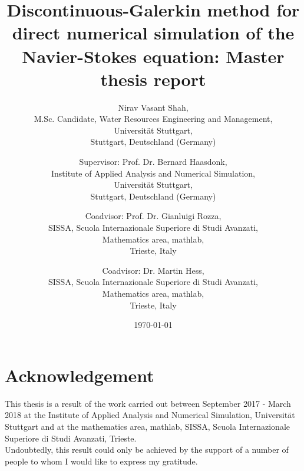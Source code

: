 \documentclass[a4paper,twoside,openright]{book}
\begin{document}
\begin{titlepage}

\title{Discontinuous-Galerkin method for direct numerical simulation of the Navier-Stokes equation: Master thesis report}


\author{Nirav Vasant Shah, \\M.Sc. Candidate, Water Resources Engineering and Management, \\Universit\"at Stuttgart, \\Stuttgart, Deutschland (Germany)\\ 
\and Supervisor: Prof. Dr. Bernard Haasdonk,\\ Institute of Applied Analysis and Numerical Simulation, \\Universit\"at Stuttgart,\\ Stuttgart, Deutschland (Germany)\\ \and Coadvisor: Prof. Dr. Gianluigi Rozza,\\ SISSA, Scuola Internazionale Superiore di Studi Avanzati, \\Mathematics area, mathlab, \\Trieste, Italy \\ \and Coadvisor: Dr. Martin Hess,\\ SISSA, Scuola Internazionale Superiore di Studi Avanzati, \\Mathematics area, mathlab,  \\Trieste, Italy }
\date{\today}
\maketitle


\end{titlepage}

\noindent

\section{Acknowledgement}

This thesis is a result of the work carried out between September 2017 - March 2018 at the Institute of Applied Analysis and Numerical Simulation, Universit\"at Stuttgart and at the mathematics area, mathlab, SISSA, Scuola Internazionale Superiore di Studi Avanzati, Trieste. \\

Undoubtedly, this result could only be achieved by the support of a number of people to whom I would like to express my gratitude.\\
\end{document}
